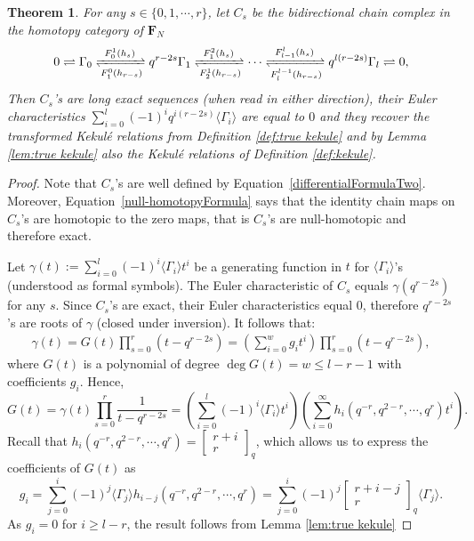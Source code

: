 \documentclass[12pt]{amsart}
\newtheorem{theorem}{Theorem}[section]
\theoremstyle{definition}
\theoremstyle{remark}
\numberwithin{equation}{section}
\numberwithin{figure}{section}
\newcommand{\Foam}{\mathbf{F}_N}
\begin{document}
\begin{theorem}\label{thm:hocat categorificaiton}
For any $s\in \{0,1,\cdots, r\}$, let $C_s$ be the bidirectional chain complex in the homotopy category of $\Foam$ 
\begin{equation}
  0\rightleftharpoons \Gamma_0\xrightleftharpoons[F_1^0(h_{r-s})]{F_0^1(h_s)}q^{r-2s}\Gamma_1\xrightleftharpoons[F_2^1(h_{r-s})]{F_1^2(h_s)} \cdots\xrightleftharpoons[F_{l}^{l-1}(h_{r-s})]{F_{l-1}^l(h_s)} q^{l(r-2s)}\Gamma_l\rightleftharpoons 0, 
  \label{LESsF}
\end{equation}
Then $C_s$'s are long exact sequences (when read in either direction), their Euler characteristics $\sum_{i=0}^l(-1)^iq^{i(r-2s)}\langle\Gamma_i\rangle$ are equal to $0$ and they recover the transformed Kekulé relations from Definition \ref{def:true kekule} and by Lemma \ref{lem:true kekule} also the Kekulé relations of Definition \ref{def:kekule}. 
\label{th:1stCat}
\end{theorem}
\begin{proof}
    Note that $C_s$'s are well defined by Equation~\ref{differentialFormulaTwo}. Moreover, Equation~\ref{null-homotopyFormula} says that the identity chain maps on $C_s$'s are homotopic to the zero maps, that is $C_s$'s are null-homotopic and therefore exact.

  Let $\gamma(t):=\sum_{i=0}^{l}(-1)^i\langle\Gamma_i\rangle t^i$ be a generating function in $t$ for $\langle\Gamma_i\rangle$'s (understood as formal symbols). The Euler characteristic of $C_s$ equals $\gamma(q^{r-2s})$ for any $s$. Since $C_s$'s are exact, their Euler characteristics equal $0$, therefore $q^{r-2s}$'s are roots of $\gamma$ (closed under inversion). It follows that:
  \begin{align*}
      \gamma(t)=G(t)\prod_{s=0}^{r}(t-q^{r-2s})=(\sum_{i=0}^{w}g_i t^i)\prod_{s=0}^{r}(t-q^{r-2s}),
  \end{align*}
  where $G(t)$ is a polynomial of degree $\deg G(t) = w\leq l-r-1$ with coefficients $g_i$. Hence,
  \[G(t)=\gamma(t)\prod_{s=0}^{r}\frac{1}{t-q^{r-2s}}=(\sum_{i=0}^{l}(-1)^i\langle\Gamma_i\rangle t^i)(\sum_{i=0}^{\infty}h_i(q^{-r},q^{2-r},\cdots,q^r)t^i).\]
  Recall that $h_i(q^{-r},q^{2-r},\cdots,q^r)=\begin{bmatrix}
    r+i\\
    r
  \end{bmatrix}_q$, which allows us to express the coefficients of $G(t)$ as 
  \[g_i=\sum_{j=0}^{i}(-1)^j\langle\Gamma_j\rangle h_{i-j}(q^{-r},q^{2-r},\cdots,q^r)=\sum_{j=0}^{i}(-1)^j\begin{bmatrix}
    r+i-j\\
    r
  \end{bmatrix}_q\langle\Gamma_j\rangle.\]
  As $g_i=0$ for $i\geq l-r$, the result follows from Lemma \ref{lem:true kekule}
\end{proof}
\end{document}
